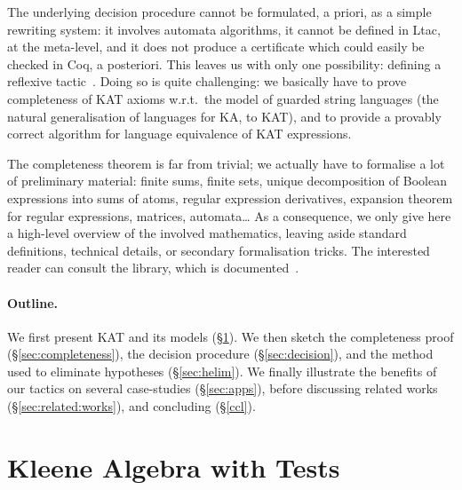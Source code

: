 \documentclass[a4paper]{llncs}
\begin{document}
\medskip

The underlying decision procedure cannot be formulated, a priori, as a
simple rewriting system: it involves automata algorithms, it cannot be
defined in Ltac, at the meta-level, and it does not produce a
certificate which could easily be checked in Coq, a posteriori. This
leaves us with only one possibility: defining a reflexive
tactic~\cite{BoyerMoore81,AllenCHA90,GregoireM05}. Doing so is quite challenging: we basically have to prove completeness
of KAT axioms w.r.t.\ the model of guarded string languages (the
natural generalisation of languages for KA, to KAT), and to provide a
provably correct algorithm for language equivalence of KAT
expressions.

The completeness theorem is far from trivial; we actually have to
formalise a lot of preliminary material: finite sums, finite sets,
unique decomposition of Boolean expressions into sums of atoms,
regular expression derivatives, expansion theorem for regular
expressions, matrices, automata\dots{} As a consequence, we only give
here a high-level overview of the involved mathematics, leaving aside
standard definitions, technical details, or secondary formalisation
tricks. The interested reader can consult the library, which is
documented~\cite{pous:coq:ra}.


\paragraph{Outline.} We first present KAT and its models
(§\ref{sec:kat}). We then sketch the completeness proof
(§\ref{sec:completeness}), the decision procedure
(§\ref{sec:decision}), and the method used to eliminate hypotheses
(§\ref{sec:helim}). We finally illustrate the benefits of our tactics
on several case-studies (§\ref{sec:apps}), before discussing related
works (§\ref{sec:related:works}), and concluding (§\ref{ccl}).


\section{Kleene Algebra with Tests}
\label{sec:kat}
\end{document}
